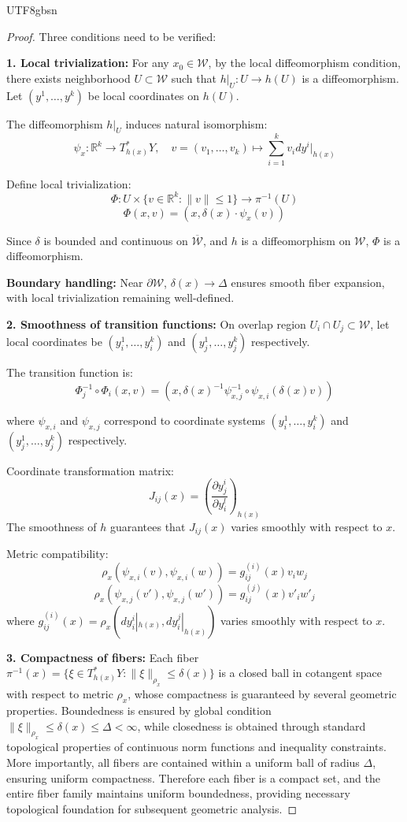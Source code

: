 \documentclass[a4paper,12pt]{extarticle}
\theoremstyle{definition}
\begin{document}
\begin{CJK}{UTF8}{gbsn}
\begin{proof}
Three conditions need to be verified:

\textbf{1. Local trivialization:} For any $x_0 \in \mathcal{W}$, by the local diffeomorphism condition, there exists neighborhood $U \subset \mathcal{W}$ such that $h|_U: U \to h(U)$ is a diffeomorphism. Let $(y^1, \ldots, y^k)$ be local coordinates on $h(U)$.

The diffeomorphism $h|_U$ induces natural isomorphism:
$$\psi_x: \mathbb{R}^k \to T^*_{h(x)}Y, \quad v = (v_1, \ldots, v_k) \mapsto \sum_{i=1}^k v_i dy^i|_{h(x)}$$

Define local trivialization:
$$\Phi: U \times \{v \in \mathbb{R}^k : \|v\| \leq 1\} \to \pi^{-1}(U)$$
$$\Phi(x, v) = (x, \delta(x) \cdot \psi_x(v))$$

Since $\delta$ is bounded and continuous on $\overline{\mathcal{W}}$, and $h$ is a diffeomorphism on $\mathcal{W}$, $\Phi$ is a diffeomorphism.

\textbf{Boundary handling:} Near $\partial \mathcal{W}$, $\delta(x) \to \Delta$ ensures smooth fiber expansion, with local trivialization remaining well-defined.


\textbf{2. Smoothness of transition functions:} On overlap region $U_i \cap U_j \subset \mathcal{W}$, let local coordinates be $(y^1_i, \ldots, y^k_i)$ and $(y^1_j, \ldots, y^k_j)$ respectively.

The transition function is:
$$\Phi_j^{-1} \circ \Phi_i(x, v) = \left(x, \delta(x)^{-1} \psi_{x,j}^{-1} \circ \psi_{x,i}(\delta(x) v)\right)$$

where $\psi_{x,i}$ and $\psi_{x,j}$ correspond to coordinate systems $(y^1_i, \ldots, y^k_i)$ and $(y^1_j, \ldots, y^k_j)$ respectively.

Coordinate transformation matrix:
$$J_{ij}(x) = \left(\frac{\partial y^i_j}{\partial y^l_i}\right)_{h(x)}$$
The smoothness of $h$ guarantees that $J_{ij}(x)$ varies smoothly with respect to $x$.

Metric compatibility:
$$\rho_x(\psi_{x,i}(v), \psi_{x,i}(w)) = g_{ij}^{(i)}(x) v_i w_j$$
$$\rho_x(\psi_{x,j}(v'), \psi_{x,j}(w')) = g_{ij}^{(j)}(x) v'_i w'_j$$
where $g_{ij}^{(i)}(x) = \rho_x(dy^i_i|_{h(x)}, dy^j_i|_{h(x)})$ varies smoothly with respect to $x$.

\textbf{3. Compactness of fibers:} Each fiber $\pi^{-1}(x) = \{\xi \in T^*_{h(x)}Y : \|\xi\|_{\rho_x} \leq \delta(x)\}$ is a closed ball in cotangent space with respect to metric $\rho_x$, whose compactness is guaranteed by several geometric properties. Boundedness is ensured by global condition $\|\xi\|_{\rho_x} \leq \delta(x) \leq \Delta < \infty$, while closedness is obtained through standard topological properties of continuous norm functions and inequality constraints. More importantly, all fibers are contained within a uniform ball of radius $\Delta$, ensuring uniform compactness. Therefore each fiber is a compact set, and the entire fiber family maintains uniform boundedness, providing necessary topological foundation for subsequent geometric analysis.


\end{proof}
\end{CJK}
\end{document}
